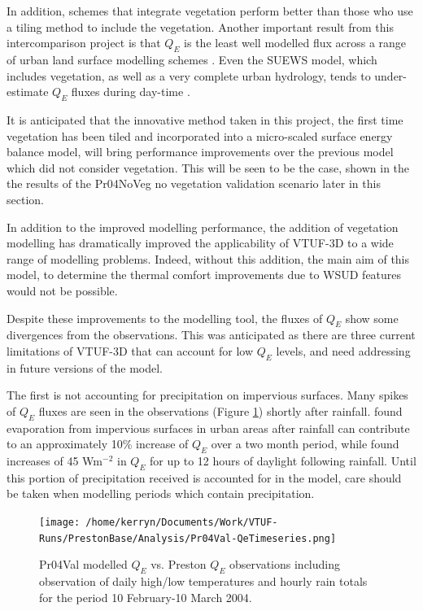 \documentclass[preprint,12pt,authoryear]{elsarticle}
\begin{document}
In addition, schemes that integrate vegetation perform better than those who use a tiling method to include the vegetation. Another important result from this intercomparison project is that $Q_{E}$ is the least well modelled flux across a range of urban land surface modelling schemes \citep{Grimmond2010}. Even the SUEWS model, which includes vegetation, as well as a very complete urban hydrology, tends to under-estimate $Q_{E}$ fluxes during day-time \citep{Jarvi2011}.

It is anticipated that the innovative method taken in this project, the first time vegetation has been tiled and incorporated into a micro-scaled surface energy balance model, will bring performance improvements over the previous model which did not consider vegetation. This will be seen to be the case, shown in the the results of the Pr04NoVeg no vegetation validation scenario later in this section. 

In addition to the improved modelling performance, the addition of vegetation modelling has dramatically improved the applicability of VTUF-3D to a wide range of modelling problems. Indeed, without this addition, the main aim of this model, to determine the thermal comfort improvements due to WSUD features would not be possible. 

Despite these improvements to the modelling tool, the fluxes of $Q_{E}$ show some divergences from the observations. This was anticipated as there are three current limitations of VTUF-3D that can account for low $Q_{E}$ levels, and need addressing in future versions of the model. 

The first is not accounting for precipitation on impervious surfaces. Many spikes of $Q_{E}$ fluxes are seen in the observations (Figure \ref{fig:Preston30DayQe}) shortly after rainfall. \cite{Demuzere2014} found evaporation from impervious surfaces in urban areas after rainfall can contribute to an approximately 10\% increase of $Q_{E}$ over a two month period, while \cite{Wouters2013} found increases of 45 Wm$^{-2}$ in $Q_{E}$ for up to 12 hours of daylight following rainfall. Until this portion of precipitation received is accounted for in the model, care should be taken when modelling periods which contain precipitation.

\begin{figure}[!htbp] 
\texttt{[image: /home/kerryn/Documents/Work/VTUF-Runs/PrestonBase/Analysis/Pr04Val-QeTimeseries.png]}
\caption{Pr04Val modelled $Q_{E}$ vs. Preston $Q_{E}$ observations including observation of daily high/low temperatures and hourly rain totals for the period 10 February-10 March 2004. \label{fig:Preston30DayQe} }     
\end{figure}
\end{document}
